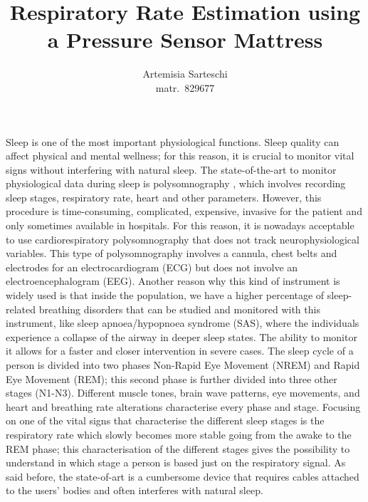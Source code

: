 \documentclass[a4paper,11pt, oneside,italian]{article}
\title{Respiratory Rate Estimation using a Pressure Sensor Mattress}
\author{Artemisia Sarteschi\\\smaller matr.~829677}
\date{}
\begin{document}
\maketitle
{}
\noindent


Sleep is one of the most important physiological functions. Sleep quality can affect physical 
and mental wellness; for this reason,
 it is crucial to monitor vital signs without interfering with natural sleep. 
 The state-of-the-art to monitor physiological data during sleep is polysomnography %
 , which involves recording sleep stages, respiratory rate, heart and other parameters. However, this procedure is time-consuming, 
 complicated, expensive, invasive for the patient and only sometimes available in hospitals. For this reason, it is nowadays 
 acceptable to use cardiorespiratory polysomnography that does not track neurophysiological variables. This type of polysomnography
involves a cannula, chest belts and electrodes for an electrocardiogram (ECG) but does not involve an electroencephalogram (EEG).
Another reason why this kind of instrument is widely used is that inside the population, we have a higher percentage of 
sleep-related breathing disorders that can be studied and monitored with this instrument, like sleep apnoea/hypopnoea syndrome (SAS), where the individuals experience a collapse 
of the airway in deeper sleep states. The ability to monitor it allows for a faster and closer intervention in severe cases. 
The sleep cycle of a person is divided into two phases Non-Rapid Eye Movement (NREM) and Rapid Eye Movement (REM);
 this second phase is further divided into three other stages (N1-N3). Different muscle tones, brain wave patterns, 
 eye movements, and heart and breathing rate alterations characterise every phase and stage.
Focusing on one of the vital signs that characterise the different sleep stages is the respiratory rate 
which slowly becomes more stable going from the awake to the REM phase; this characterisation of the different stages gives the possibility to 
understand in which stage a person is based just on the respiratory signal.
As said before, the state-of-art is a cumbersome device that 
requires cables attached to the users' bodies and often interferes with 
natural sleep. 
\end{document}
